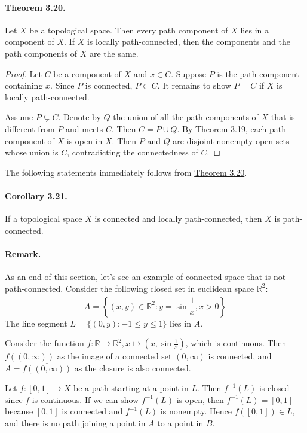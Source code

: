 \documentclass{article}
\numberwithin{equation}{section}
\theoremstyle{plain}
\theoremstyle{definition}
\begin{document}
\paragraph{Theorem 3.20.\label{thm:3.20}} Let $X$ be a topological space. Then every path component of $X$ lies in a component of $X$. If $X$ is locally path-connected, then the components and the path components of $X$ are the same.
\begin{proof}
Let $C$ be a component of $X$ and $x\in C$. Suppose $P$ is the path component containing $x$. Since $P$ is connected, $P\subset C$. It remains to show $P=C$ if $X$ is locally path-connected.

Assume $P\subsetneq C$. Denote by $Q$ the union of all the path components of $X$ that is different from $P$ and meets $C$. Then $C=P\cup Q$. By \hyperref[thm:3.19]{Theorem 3.19}, each path component of $X$ is open in $X$. Then $P$ and $Q$ are disjoint nonempty open sets whose union is $C$, contradicting the connectedness of $C$.
\end{proof}

The following statements immediately follows from \hyperref[thm:3.20]{Theorem 3.20}.
\paragraph{Corollary 3.21.\label{cor:3.21}} If a topological space $X$ is connected and locally path-connected, then $X$ is path-connected.

\paragraph{Remark.} As an end of this section, let's see an example of connected space that is not path-connected. Consider the following closed set in euclidean space $\mathbb{R}^2$:
\begin{equation*}
	A=\overline{\left\{(x,y)\in\mathbb{R}^2:y=\sin\frac{1}{x}, x>0\right\}}
\end{equation*} 
The line segment $L=\{(0,y):-1\leq y\leq 1\}$ lies in $A$.

Consider the function $f:\mathbb{R}\to\mathbb{R}^2, x\mapsto(x,\sin \frac{1}{x})$, which is continuous. Then $f((0,\infty))$ as the image of a connected set $(0,\infty)$ is connected, and $A=\overline{f((0,\infty))}$ as the closure is also connected.

Let $f:[0,1]\to X$ be a path starting at a point in $L$. Then $f^{-1}(L)$ is closed since $f$ is continuous. If we can show $f^{-1}(L)$ is open, then $f^{-1}(L)=[0,1]$ because $[0,1]$ is connected and $f^{-1}(L)$ is nonempty. Hence $f([0,1])\in L$, and there is no path joining a point in $A$ to a point in $B$.
\end{document}
